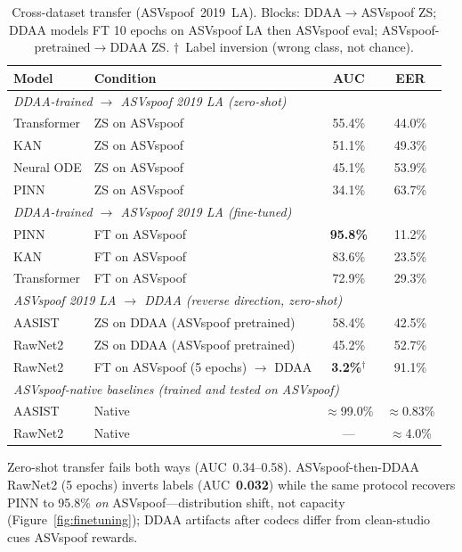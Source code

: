 \documentclass{article}
\newcommand{\ddaa}{\textsc{DDAA}}
\begin{document}
\begin{table}[ht]
  \caption{Cross-dataset transfer (ASVspoof~2019~LA). Blocks: \ddaa{}$\rightarrow$ASVspoof ZS;
  \ddaa{} models FT 10 epochs on ASVspoof LA then ASVspoof eval; ASVspoof-pretrained$\rightarrow$\ddaa{} ZS.
  $\dagger$~Label inversion (wrong class, not chance).}
  \label{tab:t3}
  \centering
  \setlength{\tabcolsep}{7pt}
  \begin{tabular}{llcc}
    \toprule
    Model & Condition & AUC & EER \\
    \midrule
    \multicolumn{4}{l}{\textit{\ddaa-trained $\rightarrow$ ASVspoof 2019 LA (zero-shot)}} \\
    Transformer & ZS on ASVspoof & 55.4\% & 44.0\% \\
    KAN         & ZS on ASVspoof & 51.1\% & 49.3\% \\
    Neural ODE  & ZS on ASVspoof & 45.1\% & 53.9\% \\
    PINN        & ZS on ASVspoof & 34.1\% & 63.7\% \\
    \midrule
    \multicolumn{4}{l}{\textit{\ddaa-trained $\rightarrow$ ASVspoof 2019 LA (fine-tuned)}} \\
    PINN        & FT on ASVspoof & \textbf{95.8\%} & 11.2\% \\
    KAN         & FT on ASVspoof & 83.6\% & 23.5\% \\
    Transformer & FT on ASVspoof & 72.9\% & 29.3\% \\
    \midrule
    \multicolumn{4}{l}{\textit{ASVspoof 2019 LA $\rightarrow$ \ddaa{} (reverse direction, zero-shot)}} \\
    AASIST  & ZS on \ddaa{} (ASVspoof pretrained)     & 58.4\% & 42.5\% \\
    RawNet2 & ZS on \ddaa{} (ASVspoof pretrained)     & 45.2\% & 52.7\% \\
    RawNet2 & FT on ASVspoof (5 epochs) $\rightarrow$ \ddaa{} & \textbf{3.2\%}$^\dagger$  & 91.1\% \\
    \midrule
    \multicolumn{4}{l}{\textit{ASVspoof-native baselines (trained and tested on ASVspoof)}} \\
    AASIST  & Native & $\approx$99.0\% & $\approx$0.83\% \\
    RawNet2 & Native & ---             & $\approx$4.0\%  \\
    \bottomrule
  \end{tabular}
\end{table}

Zero-shot transfer fails both ways (AUC~0.34--0.58).  ASVspoof-then-\ddaa{}
RawNet2 (5 epochs) inverts labels (AUC~\textbf{0.032}) while the same protocol
recovers PINN to 95.8\% \emph{on} ASVspoof---distribution shift, not capacity
(Figure~\ref{fig:finetuning}); \ddaa{} artifacts after codecs differ from clean-studio cues ASVspoof rewards.
\end{document}
